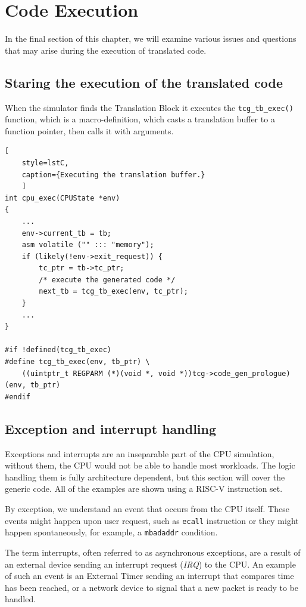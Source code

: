 \pagebreak

\section{Code Execution}

In the final section of this chapter, we will examine various issues and questions that may arise during the execution
of translated code.

\subsection{Staring the execution of the translated code}

When the simulator finds the Translation Block it executes the \texttt{tcg\_tb\_exec()} function, which is a
macro-definition, which casts a translation buffer to a function pointer, then calls it with arguments.

\begin{lstlisting}[
    style=lstC,
    caption={Executing the translation buffer.}
    ]
int cpu_exec(CPUState *env)
{
    ...
    env->current_tb = tb;
    asm volatile ("" ::: "memory");
    if (likely(!env->exit_request)) {
        tc_ptr = tb->tc_ptr;
        /* execute the generated code */
        next_tb = tcg_tb_exec(env, tc_ptr);
    }
    ...
}

#if !defined(tcg_tb_exec)
#define tcg_tb_exec(env, tb_ptr) \
    ((uintptr_t REGPARM (*)(void *, void *))tcg->code_gen_prologue)(env, tb_ptr)
#endif
\end{lstlisting}

\subsection{Exception and interrupt handling}

Exceptions and interrupts are an inseparable part of the CPU simulation, without them, the CPU would not be able to
handle most workloads. The logic handling them is fully architecture dependent, but this section will cover the
generic code. All of the examples are shown using a RISC-V instruction set.

By exception, we understand an event that occurs from the CPU itself. These events might happen upon user request, such
as \texttt{ecall} instruction or they might happen spontaneously, for example, a \texttt{mbadaddr} condition.

The term interrupts, often referred to as asynchronous exceptions, are a result of an external device sending an
interrupt request (\textit{IRQ}) to the CPU. An example of such an event is an External Timer sending an interrupt that
compares time has been reached, or a network device to signal that a new packet is ready to be handled.


